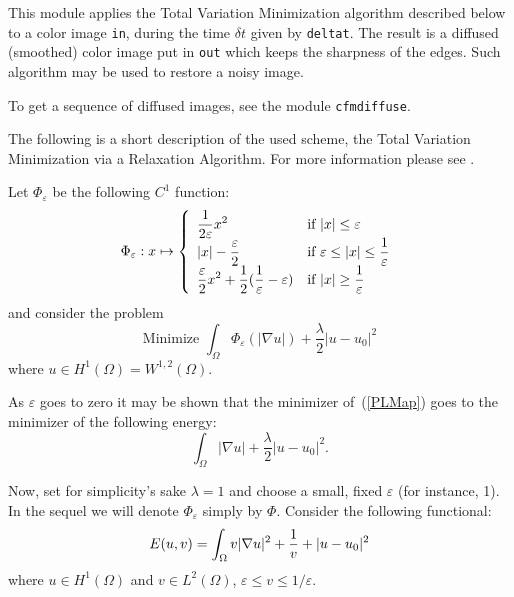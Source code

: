 \def\Om{\Omega}
\def\la{\lambda}
\def\gu{\nabla u}
\def\ve{\varepsilon}
\def\lp#1{{L}^{#1}}
\def\wlp#1#2{{W}^{#1,#2}}
\def\HunO{{H}^1(\Om)}
\def\ltwo{\lp{2}}
\def\ltwoO{\ltwo(\Om)}
\def\ds{\displaystyle}
\def\Ref#1{(\ref{#1})}

This module applies the Total Variation Minimization algorithm described
below to a color image \verb+in+, during the time $\delta t$ given by
\verb+deltat+.
The result is a diffused (smoothed) color image put in \verb+out+ which 
keeps the sharpness of the edges.
Such algorithm may be used to restore a noisy image.

To get a sequence of diffused images, see the module \verb+cfmdiffuse+.

\medskip

The following is a short description of the used scheme, the Total Variation Minimization via a Relaxation Algorithm.
For more information please see \cite{ChambolleLions}.

Let $\Phi_\ve$ be the following $C^1$ function:
\begin{equation}\label{defphi}
\Phi_\ve : x \mapsto \left\{ \begin{array}{ll}
\ds{{1\over 2\ve} x^2} & \mbox{if } |x|\leq \ve \\
\ds{|x|-{\ve\over 2}}  & \mbox{if } \ve \leq |x| \leq \ds{1\over \ve} \\
\ds{{\ve\over 2} x^2 + {1\over 2}({1\over \ve}-\ve)}
& \mbox{if } |x|\geq \ds{1\over \ve}
\end{array}\right.
\end{equation}
and consider the problem
\begin{equation}\label{PLMap}
\mbox{Minimize } \int_\Om \Phi_\ve(|\gu|) + \frac{\la}{2} |u-u_0|^2
\end{equation}
where $u\in \HunO = \wlp{1}{2}(\Om)$.

As $\ve$ goes to zero it may be shown that the minimizer of~\Ref{PLMap}
goes to the minimizer of the following energy:
\begin{equation}\label{PLMap2}
\int_\Om |\gu| + \frac{\la}{2} |u-u_0|^2.
\end{equation}

Now, set for simplicity's sake
$\la = 1$ and choose a small, fixed $\ve$ (for instance, 1).
In the sequel we will denote $\Phi_\ve$ simply by $\Phi$.
Consider the following functional:
\begin{equation} \label{erelax}
E(u,v) = \int_\Om v |\gu|^2 + {1\over v} + |u-u_0|^2
\end{equation}
where $u\in \HunO$ and $v\in \ltwoO$, $\ve \leq v \leq 1/\ve$.

